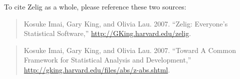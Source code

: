 To cite Zelig as a whole, please reference these two sources:
\begin{verse}
  Kosuke Imai, Gary King, and Olivia Lau. 2007. ``Zelig: Everyone's
  Statistical Software,'' \url{http://GKing.harvard.edu/zelig}.
\end{verse}
\begin{verse}
  Kosuke Imai, Gary King, and Olivia Lau. 2007. ``Toward A Common
  Framework for Statistical Analysis and Development,''
  \url{http://gking.harvard.edu/files/abs/z-abs.shtml}.
\end{verse}

